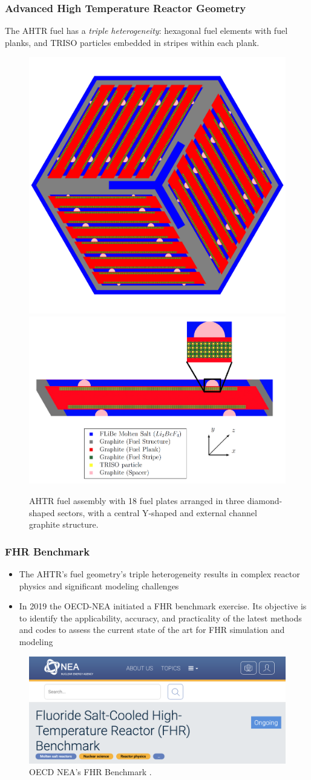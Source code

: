 \begin{frame}
  \frametitle{Advanced High Temperature Reactor Geometry}
  The AHTR fuel has a \emph{triple heterogeneity}: hexagonal fuel elements with 
  fuel planks, and TRISO particles embedded in stripes within each plank.
  \begin{figure}[]
    \includegraphics[width=0.49\linewidth]{../docs/figures/ahtr-fuel-element.png} 
    \includegraphics[width=0.49\linewidth]{figures/ahtr-plank.png}
    \caption{AHTR fuel assembly with 18 fuel plates arranged in 
    three diamond-shaped sectors, with a central Y-shaped and external channel 
    graphite structure.}
\end{figure}
\end{frame}

\begin{frame}
  \frametitle{FHR Benchmark}
  \begin{itemize}
    \item The AHTR's fuel geometry's triple heterogeneity results in
    complex reactor physics and significant modeling challenges
    \item In 2019 the OECD-NEA initiated a FHR benchmark exercise. Its objective 
    is to identify the applicability, accuracy, and practicality of the latest 
    methods and codes to assess the current state of the art for FHR simulation 
    and modeling
  \end{itemize}
  \begin{figure}[]
    \includegraphics[width=0.7\linewidth]{figures/benchmark.png} 
    \caption{OECD NEA's FHR Benchmark \cite{petrovic_benchmark_2021}.}
\end{figure}
\end{frame}
